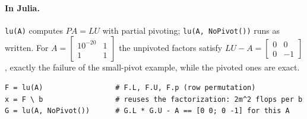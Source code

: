 \paragraph{In Julia.} \texttt{lu(A)} computes $PA = LU$ with partial pivoting; \texttt{lu(A, NoPivot())} runs  as written. For $A = \left[\begin{smallmatrix} 10^{-20} & 1 \\ 1 & 1 \end{smallmatrix}\right]$ the unpivoted factors satisfy $LU - A = \left[\begin{smallmatrix} 0 & 0 \\ 0 & -1 \end{smallmatrix}\right]$, exactly the failure of the small-pivot example, while the pivoted ones are exact.
\begin{lstlisting}
F = lu(A)                 # F.L, F.U, F.p (row permutation)
x = F \ b                 # reuses the factorization: 2m^2 flops per b
G = lu(A, NoPivot())      # G.L * G.U - A == [0 0; 0 -1] for this A
\end{lstlisting}
